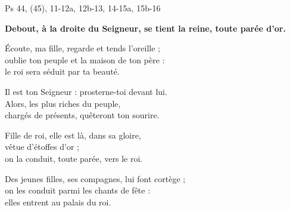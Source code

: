 Ps 44, (45), 11-12a, 12b-13, 14-15a, 15b-16

\textbf{Debout, à la droite du Seigneur,
se tient la reine, toute parée d’or.}

\smallskip

Écoute, ma fille, regarde et tends l’oreille ;\\
oublie ton peuple et la maison de ton père :\\
le roi sera séduit par ta beauté.

\smallskip

Il est ton Seigneur : prosterne-toi devant lui.\\
Alors, les plus riches du peuple,\\
chargés de présents, quêteront ton sourire.

\smallskip

Fille de roi, elle est là, dans sa gloire,\\
vêtue d’étoffes d’or ;\\
on la conduit, toute parée, vers le roi.

\smallskip

Des jeunes filles, ses compagnes, lui font cortège ;\\
on les conduit parmi les chants de fête :\\
elles entrent au palais du roi.
